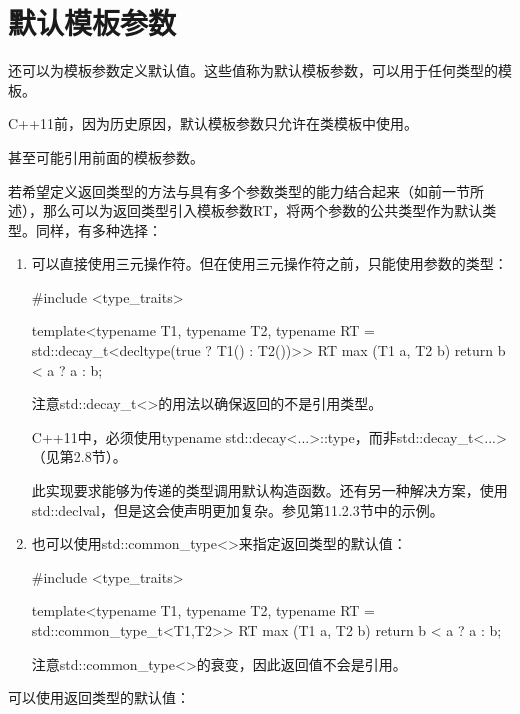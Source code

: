 \section{默认模板参数}

还可以为模板参数定义默认值。这些值称为默认模板参数，可以用于任何类型的模板。

\begin{notice}
C++11前，因为历史原因，默认模板参数只允许在类模板中使用。
\end{notice}

甚至可能引用前面的模板参数。

若希望定义返回类型的方法与具有多个参数类型的能力结合起来（如前一节所述），那么可以为返回类型引入模板参数RT，将两个参数的公共类型作为默认类型。同样，有多种选择：

\begin{enumerate}
\item 
可以直接使用三元操作符。但在使用三元操作符之前，只能使用参数的类型：

\begin{cpp}
#include <type_traits>

template<typename T1, typename T2,
typename RT = std::decay_t<decltype(true ? T1() : T2())>>
RT max (T1 a, T2 b)
{
	return b < a ? a : b;
}
\end{cpp}

注意std::decay\_t<>的用法以确保返回的不是引用类型。

\begin{notice}
C++11中，必须使用typename std::decay<...>::type，而非std::decay\_t<...>（见第2.8节）。
\end{notice}

此实现要求能够为传递的类型调用默认构造函数。还有另一种解决方案，使用std::declval，但是这会使声明更加复杂。参见第11.2.3节中的示例。

\item
也可以使用std::common\_type<>来指定返回类型的默认值：

\begin{cpp}
#include <type_traits>

template<typename T1, typename T2,
typename RT = std::common_type_t<T1,T2>>
RT max (T1 a, T2 b)
{
	return b < a ? a : b;
}
\end{cpp}

注意std::common\_type<>的衰变，因此返回值不会是引用。
\end{enumerate}

可以使用返回类型的默认值：

